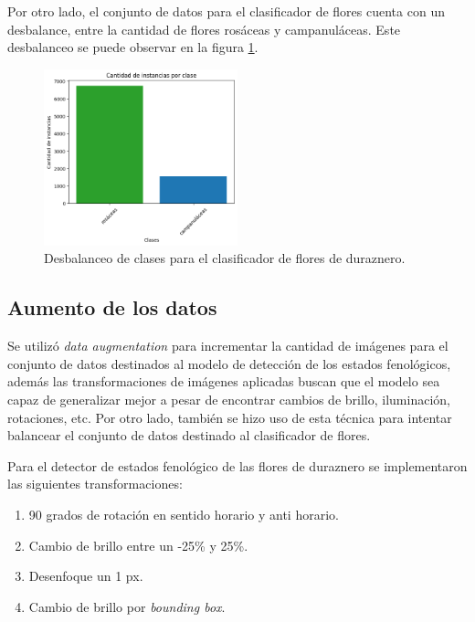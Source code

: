 Por otro lado, el conjunto de datos para el clasificador de flores cuenta con un desbalance, entre la cantidad de flores rosáceas y campanuláceas. Este desbalanceo se puede observar en la figura \ref{fig:desbalanceoClass}.

\begin{figure}[ht]
	\centering
	\includegraphics[width=0.5\textwidth, height=0.5\textwidth]{./Figures/tipodeflor_desbalance.png}
	\caption{Desbalanceo de clases para el clasificador de flores de duraznero.}
	\label{fig:desbalanceoClass}
\end{figure}

\subsection{Aumento de los datos}

Se utilizó \textit{data augmentation} para incrementar la cantidad de imágenes para el conjunto de datos destinados al modelo de detección de los estados fenológicos, además las transformaciones de imágenes aplicadas buscan que el modelo sea capaz de generalizar mejor a pesar de encontrar cambios de brillo, iluminación, rotaciones, etc. Por otro lado, también se hizo uso de esta técnica para intentar balancear el conjunto de datos destinado al clasificador de flores.

Para el detector de estados fenológico de las flores de duraznero se implementaron las siguientes transformaciones:

\begin{enumerate}
	\item 90 grados de rotación en sentido horario y anti horario.
	\item Cambio de brillo entre un -25\% y 25\%. 
	\item Desenfoque un 1 px.
	\item Cambio de brillo por \textit{bounding box}.
\end{enumerate}

